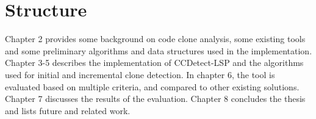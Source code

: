 \section{Structure}

Chapter 2 provides some background on code clone analysis, some existing tools and some
preliminary algorithms and data structures used in the implementation. Chapter 3-5
describes the implementation of CCDetect-LSP and the algorithms used for initial and
incremental clone detection. In chapter 6, the tool is evaluated based on multiple
criteria, and compared to other existing solutions. Chapter 7 discusses the results of the
evaluation. Chapter 8 concludes the thesis and lists future and related work.
